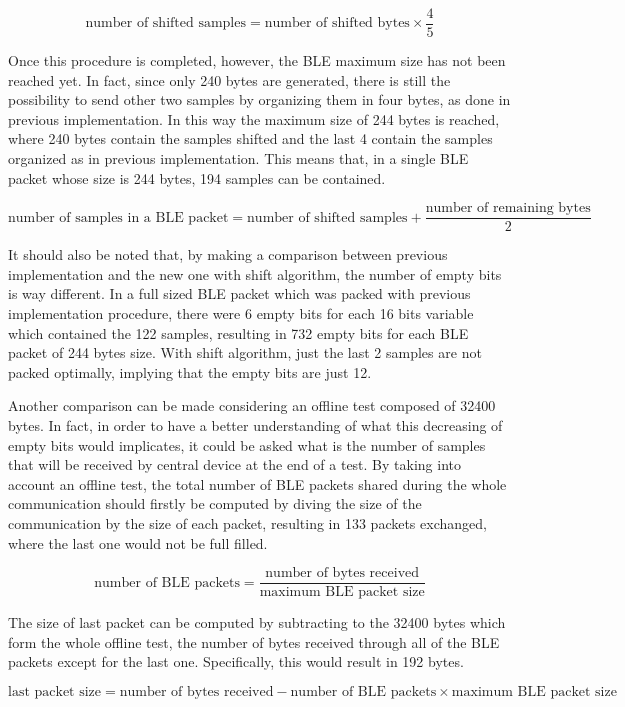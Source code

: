\documentclass{Configuration_Files/PoliMi3i_thesis}
\begin{document}
\[
\text{number of shifted samples} = \text{number of shifted bytes} \times \frac{4}{5}
\]

Once this procedure is completed, however, the BLE maximum size has not been reached yet. In fact, since only 240 bytes are generated, there is still the possibility to send other two samples by organizing them in four bytes, as done in previous implementation. In this way the maximum size of 244 bytes is reached, where 240 bytes contain the samples shifted and the last 4 contain the samples organized as in previous implementation. This means that, in a single BLE packet whose size is 244 bytes, 194 samples can be contained.

\[
\text{number of samples in a BLE packet} = \text{number of shifted samples} + \frac{\text{number of remaining bytes}}{2}
\]

It should also be noted that, by making a comparison between previous implementation and the new one with shift algorithm, the number of empty bits is way different. In a full sized BLE packet which was packed with previous implementation procedure, there were 6 empty bits for each 16 bits variable which contained the 122 samples, resulting in 732 empty bits for each BLE packet of 244 bytes size. With shift algorithm, just the last 2 samples are not packed optimally, implying that the empty bits are just 12.

Another comparison can be made considering an offline test composed of 32400 bytes. In fact, in order to have a better understanding of what this decreasing of empty bits would implicates, it could be asked what is the number of samples that will be received by central device at the end of a test. By taking into account an offline test, the total number of BLE packets shared during the whole communication should firstly be computed by diving the size of the communication by the size of each packet, resulting in 133 packets exchanged, where the last one would not be full filled.

\[
\text{number of BLE packets} = \frac{\text{number of bytes received}}{\text{maximum BLE packet size}} 
\]

The size of last packet can be computed by subtracting to the 32400 bytes which form the whole offline test, the number of bytes received through all of the BLE packets except for the last one. Specifically, this would result in 192 bytes.

\[
\text{last packet size} = \text{number of bytes received} - \text{number of BLE packets} \times \text{maximum BLE packet size}
\]
\end{document}
